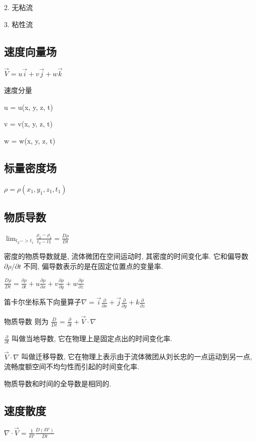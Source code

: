 \documentclass[UTF8]{ctexart}
\begin{document}
2. 无粘流

3. 粘性流

\subsection{速度向量场}

$\vec{V} = u\vec{i} + v\vec{j} + w\vec{k}$

速度分量

u = u(x, y, z, t)

v = v(x, y, z, t)

w = w(x, y, z, t)

\subsection{标量密度场}

$\rho = \rho (x_1, y_1, z_1, t_1)$

\subsection{物质导数}

$\lim _{t_2 -> t_1} \frac{\rho_2 - \rho_1}{t_2 - t1} = \frac{D\rho}{Dt}$

密度的物质导数就是, 流体微团在空间运动时, 其密度的时间变化率.  它和偏导数$\partial \rho / \partial t$ 不同, 偏导数表示的是在固定位置点的变量率.

$\frac{D\rho}{Dt} = \frac{\partial \rho}{\partial t} + u \frac{\partial \rho}{\partial x} + v \frac{\partial \rho}{\partial y} + w \frac{\partial \rho}{\partial z}$

笛卡尔坐标系下向量算子$\nabla = \vec{i} \frac{\partial}{\partial x} + \vec{j} \frac{\partial}{\partial y} + k \frac{\partial}{ \partial z}$

物质导数 则为 $\frac{D}{Dt} = \frac{\partial}{\partial t} + \vec{V} \cdot \nabla$

$\frac{\partial}{\partial t}$ 叫做当地导数, 它在物理上是固定点出的时间变化率.

$\vec{V} \cdot \nabla$ 叫做迁移导数, 它在物理上表示由于流体微团从刘长忠的一点运动到另一点, 流畅度额空间不均匀性而引起的时间变化率.

物质导数和时间的全导数是相同的.

\subsection{速度散度}

$\nabla \cdot \vec{V} = \frac{1}{\delta \mathcal{V} } \frac{D(\delta \mathcal{V})}{Dt}$
\end{document}
